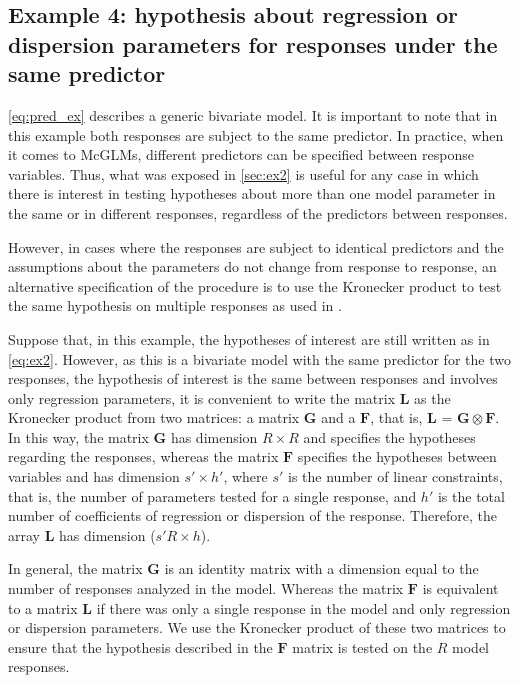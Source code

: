 \documentclass[AMA,STIX1COL]{WileyNJD-v2}
\begin{document}
\subsection{Example 4: hypothesis about regression or dispersion parameters for responses under the same predictor}\label{sec:sec_ex4}

\autoref{eq:pred_ex} describes a generic bivariate model. It is important to note that in this example both responses are subject to the same predictor. In practice, when it comes to McGLMs, different predictors can be specified between response variables. Thus, what was exposed in \autoref{sec:ex2} is useful for any case in which there is interest in testing hypotheses about more than one model parameter in the same or in different responses, regardless of the predictors between responses.

However, in cases where the responses are subject to identical predictors and the assumptions about the parameters do not change from response to response, an alternative specification of the procedure is to use the Kronecker product to test the same hypothesis on multiple responses as used in \cite{plastica}.

Suppose that, in this example, the hypotheses of interest are still written as in \autoref{eq:ex2}. However, as this is a bivariate model with the same predictor for the two responses, the hypothesis of interest is the same between responses and involves only regression parameters, it is convenient to write the matrix $\boldsymbol{L}$ as the Kronecker product from two matrices: a matrix $\boldsymbol{G}$ and a $\boldsymbol{F}$, that is, $\boldsymbol{L}$ = $\boldsymbol{G} \otimes \boldsymbol{F}$. In this way, the matrix $\boldsymbol{G}$ has dimension $R \times R$ and specifies the hypotheses regarding the responses, whereas the matrix $\boldsymbol{F}$ specifies the hypotheses between variables and has dimension ${s} ' \times {h}'$, where ${s}'$ is the number of linear constraints, that is, the number of parameters tested for a single response, and ${h}'$ is the total number of coefficients of regression or dispersion of the response. Therefore, the array $\boldsymbol{L}$ has dimension (${s}'R \times h$).

In general, the matrix $\boldsymbol{G}$ is an identity matrix with a dimension equal to the number of responses analyzed in the model. Whereas the matrix $\boldsymbol{F}$ is equivalent to a matrix $\boldsymbol{L}$ if there was only a single response in the model and only regression or dispersion parameters. We use the Kronecker product of these two matrices to ensure that the hypothesis described in the $\boldsymbol{F}$ matrix is tested on the $R$ model responses.
\end{document}
